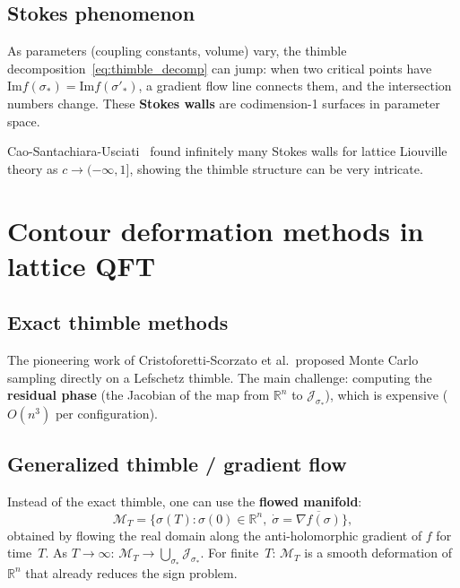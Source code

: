 \documentclass[12pt]{article}
\theoremstyle{definition}
\theoremstyle{remark}
\newcommand{\R}{\mathbb{R}}
\newcommand{\im}{\mathrm{Im}}
\begin{document}
\subsection{Stokes phenomenon}

As parameters (coupling constants, volume) vary, the thimble
decomposition~\eqref{eq:thimble_decomp} can jump: when two critical
points have $\im f(\sigma_*) = \im f(\sigma'_*)$, a gradient flow
line connects them, and the intersection numbers change. These
\textbf{Stokes walls} are codimension-1 surfaces in parameter space.

Cao-Santachiara-Usciati~\cite{CSU23} found infinitely many Stokes
walls for lattice Liouville theory as $c \to (-\infty,1]$, showing
the thimble structure can be very intricate.

\section{Contour deformation methods in lattice QFT}

\subsection{Exact thimble methods}

The pioneering work of Cristoforetti-Scorzato et al.\ proposed
Monte Carlo sampling directly on a Lefschetz thimble. The main
challenge: computing the \textbf{residual phase} (the Jacobian
of the map from $\R^n$ to $\mathcal{J}_{\sigma_*}$), which is
expensive ($O(n^3)$ per configuration).

\subsection{Generalized thimble / gradient flow}

Instead of the exact thimble, one can use the \textbf{flowed
manifold}:
\begin{equation}
  \mathcal{M}_T = \bigl\{\sigma(T) : \sigma(0) \in \R^n,\;
    \dot\sigma = \overline{\nabla f(\sigma)}\bigr\},
\end{equation}
obtained by flowing the real domain along the anti-holomorphic
gradient of $f$ for time~$T$. As $T \to \infty$:
$\mathcal{M}_T \to \bigcup_{\sigma_*} \mathcal{J}_{\sigma_*}$.
For finite~$T$: $\mathcal{M}_T$ is a smooth deformation of $\R^n$
that already reduces the sign problem.
\end{document}
